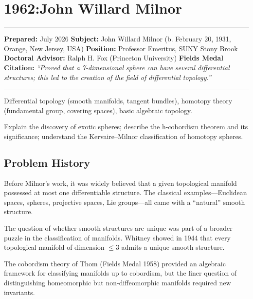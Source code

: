 \chapter{1962:John Willard Milnor}\label{ch1962johnwillardmilnor:john-willard-milnor-fields-medal-1962-a-comprehensive-report}

\begin{center}\rule{0.5\linewidth}{0.5pt}\end{center}

\textbf{Prepared:} July 2026
\textbf{Subject:} John Willard Milnor (b. February 20, 1931, Orange, New Jersey, USA)
\textbf{Position:} Professor Emeritus, SUNY Stony Brook
\textbf{Doctoral Advisor:} Ralph H. Fox (Princeton University)
\textbf{Fields Medal Citation:} \emph{``Proved that a 7-dimensional sphere can
have several differential structures; this led to the creation of the field of
differential topology.''}

\begin{center}\rule{0.5\linewidth}{0.5pt}\end{center}

\begin{prereqs} Differential topology (smooth manifolds, tangent bundles),
homotopy theory (fundamental group, covering spaces), basic algebraic topology.
\end{prereqs}

\begin{objectives} Explain the discovery of exotic spheres; describe the
h-cobordism theorem and its significance; understand the Kervaire--Milnor
classification of homotopy spheres. \end{objectives}

\section{Problem History}

Before Milnor's work, it was widely believed that a given topological manifold
possessed at most one differentiable structure. The classical examples---Euclidean
spaces, spheres, projective spaces, Lie groups---all came with a ``natural''
smooth structure.

The question of whether smooth structures are unique was part of a broader puzzle
in the classification of manifolds. Whitney showed in 1944 that every topological
manifold of dimension $\leq 3$ admits a unique smooth structure.

The cobordism theory of Thom (Fields Medal 1958) provided an algebraic framework
for classifying manifolds up to cobordism, but the finer question of distinguishing
homeomorphic but non-diffeomorphic manifolds required new invariants.

